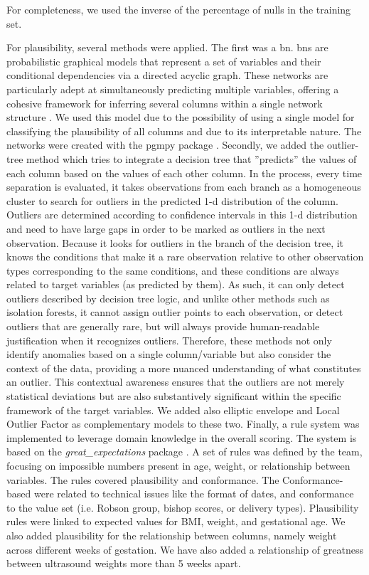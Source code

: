 For completeness, we used the inverse of the percentage of nulls in the training set. 

For plausibility, several methods were applied. The first was a \ac{bn}. \acp{bn} are probabilistic graphical models that represent a set of variables and their conditional dependencies via a directed acyclic graph. These networks are particularly adept at simultaneously predicting multiple variables, offering a cohesive framework for inferring several columns within a single network structure \cite{pearl1988probabilistic}.
We used this model due to the possibility of using a single model for classifying the plausibility of all columns and due to its interpretable nature. The networks were created with the pgmpy package \cite{pgmpy}. Secondly, we added the outlier-tree method \cite{cortesExplainableOutlierDetection2020} which tries to integrate a decision tree that ”predicts” the values of each column based on the values of each other column. In the process, every time separation is evaluated, it takes observations from each branch as a homogeneous cluster to search for outliers in the predicted 1-d distribution of the column. Outliers are determined according to confidence intervals in this 1-d distribution and need to have large gaps in order to be marked as outliers in the next observation. Because it looks for outliers in the branch of the decision tree, it knows the conditions that make it a rare observation relative to other observation types corresponding to the same conditions, and these conditions are always related to target variables (as predicted by them). As such, it can only detect outliers described by decision tree logic, and unlike other methods such as isolation forests, it cannot assign outlier points to each observation, or detect outliers that are generally rare, but will always provide human-readable justification when it recognizes outliers. Therefore, these methods not only identify anomalies based on a single column/variable but also consider the context of the data, providing a more nuanced understanding of what constitutes an outlier. This contextual awareness ensures that the outliers are not merely statistical deviations but are also substantively significant within the specific framework of the target variables. We added also elliptic envelope and Local Outlier Factor as complementary models to these two. Finally, a rule system was implemented to leverage domain knowledge in the overall scoring. The system is based on the \textit{great\_expectations} package \cite{GXProactiveCollaborative}. A set of rules was defined by the team, focusing on impossible numbers present in age, weight, or relationship between variables. The rules covered plausibility and conformance. The Conformance-based were related to technical issues like the format of dates, and conformance to the value set (i.e. Robson group, bishop scores, or delivery types). Plausibility rules were linked to expected values for BMI, weight, and gestational age. We also added plausibility for the relationship between columns, namely weight across different weeks of gestation. We have also added a relationship of greatness between ultrasound weights more than 5 weeks apart. 

